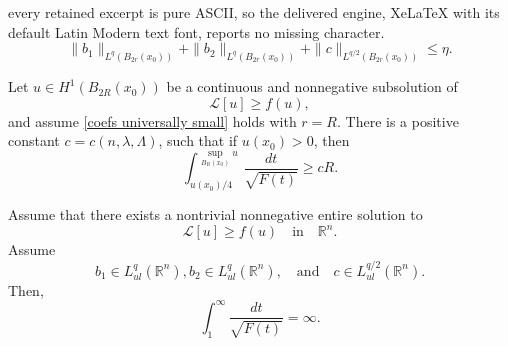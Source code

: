 \documentclass[10pt,a4paper]{amsart}
\begin{document}
every retained excerpt is pure ASCII, so the delivered engine, XeLaTeX with its default Latin Modern text font, reports no missing character.
\begin{equation}\label{coefs universally small}
    \|b_1\|_{L^{q}(B_{2r}(x_0))} + \|b_2\|_{L^{q}(B_{2r}(x_0))} + \|c\|_{L^{q/2}(B_{2r}(x_0))} \leq \eta.
\end{equation}

\begin{proposition}\label{integral lower bound}
Let $u \in H^1(B_{2R}(x_0))$ be a continuous and nonnegative subsolution of
$$
    \mathcal{L}[u] \geq f(u),
$$
and assume \eqref{coefs universally small} holds with $r = R$. There is a positive constant $c = c(n,\lambda,\Lambda)$, such that if $u(x_0)>0$, then
$$
    \int_{u(x_0)/4}^{\sup_{B_R(x_0)}u}\frac{dt}{\sqrt{F(t)}} \geq cR.
$$
\end{proposition}

\begin{corollary}\label{keller osserman}
Assume that there exists a nontrivial nonnegative entire solution to
$$
    \mathcal{L}[u] \geq f(u) \quad \text{in} \quad \mathbb{R}^n.
$$
Assume 
$$
    b_1 \in L^{q}_{ul}(\mathbb{R}^n), b_2 \in L^{q}_{ul}(\mathbb{R}^n), \quad \text{and} \quad c \in L^{q/2}_{ul}(\mathbb{R}^n).
$$
Then,
\begin{equation}\label{keller-osserman}
    \int_{1}^{\infty} \frac{dt}{\sqrt{F(t)}} = \infty.
\end{equation}
\end{corollary}
\end{document}
